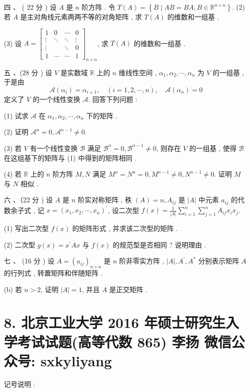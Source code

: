 \documentclass[10pt]{article}
\begin{document}
{\begin{enumerate}
\end{enumerate}
 四 、 ( 22  分 )  设  $A$  是  $n$  阶方阵 .  令  $T(A)=\left\{B \mid A B=B A, B \in \mathbb{R}^{n \times n}\right\}$. (2)  若  $A$  是主对角线元素两两不等的对角矩阵 ,  求  $T(A)$  的维数和一组基 .

(3)  设  $A=\left[\begin{array}{cccc}1 & 0 & \cdots & 0 \\ \vdots & \ddots & \ddots & \vdots \\ \vdots & & \ddots & 0 \\ 1 & \cdots & \cdots & 1\end{array}\right]_{n \times n}$,  求  $T(A)$  的维数和一组基 .

 五 、(28  分 )  设  $V$  是实数域  $\mathbb{R}$  上的  $n$  维线性空间 , $\alpha_{1}, \alpha_{2}, \cdots, \alpha_{n}$  为  $V$  的一组基 ,  于是由 
$$
\mathscr{A}\left(\alpha_{i}\right)=\alpha_{i+1}, \quad(i=1,2, \cdots, n), \quad \mathscr{A}\left(\alpha_{n}\right)=0
$$
 定义了  $V$  的一个线性变换  $\mathscr{A}$.  回答下列问题 :

(1)  试求  $\mathscr{A}$  在  $\alpha_{1}, \alpha_{2}, \cdots, \alpha_{n}$  下的矩阵 .

(2)  证明  $\mathscr{A}^{n}=0, \mathscr{A}^{n-1} \neq 0$.

(3)  若  $V$  有一个线性变换  $\mathscr{B}$  满足  $\mathscr{B}^{n}=0, \mathscr{B}^{n-1} \neq 0$,  则存在  $V$  的一组基 ,  使得  $\mathscr{B}$  在这组基下的矩阵与  (1)  中得到的矩阵相同 .

(4)  若  $\mathbb{R}$  上的  $n$  阶方阵  $M, N$  满足  $M^{n}=N^{n}=0, M^{n-1} \neq 0, N^{n-1} \neq 0$.  证明  $M$  与  $N$  相似 .

 六 、（22  分 )  设  $A$  是  $n$  阶实对称矩阵 ,  秩  $(A)=n, A_{i j}$  是  $|A|$  中元素  $a_{i j}$  的代数余子式 ,  记  $x=\left(x_{1}, x_{2}, \cdots, x_{n}\right)^{\prime}$,  设二次型  $f(x)=\frac{1}{|A|} \sum_{i=1}^{n} \sum_{j=1}^{n} A_{i j} x_{i} x_{j}$.

(1)  写出二次型  $f(x)$  的矩阵形式 ,  并求该二次型的矩阵 .

(2)  二次型  $g(x)=x^{\prime} A x$  与  $f(x)$  的规范型是否相同 ?  说明理由 .

 七 、 (16  分 )  设  $A=\left(a_{i j}\right)_{n \times n}$  是  $n$  阶非零实方阵 , $|A|, A^{\prime}, A^{*}$  分别表示矩阵  $A$  的行列式 ,  转置矩阵和伴随矩阵 .

(b)  若  $n>2$,  证明  $|A|=1$,  并且  $A$  是正交矩阵 .

\section{8. 北京工业大学 2016 年硕士研究生入学考试试题(高等代数 865) 
 李扬 
 微信公众号: sxkyliyang}
 记号说明 :

}
\end{document}
